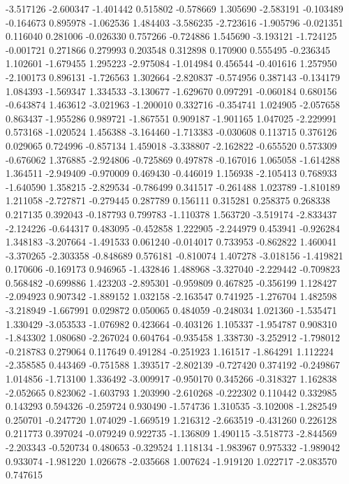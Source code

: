 -3.517126
-2.600347
-1.401442
0.515802
-0.578669
1.305690
-2.583191
-0.103489
-0.164673
0.895978
-1.062536
1.484403
-3.586235
-2.723616
-1.905796
-0.021351
0.116040
0.281006
-0.026330
0.757266
-0.724886
1.545690
-3.193121
-1.724125
-0.001721
0.271866
0.279993
0.203548
0.312898
0.170900
0.555495
-0.236345
1.102601
-1.679455
1.295223
-2.975084
-1.014984
0.456544
-0.401616
1.257950
-2.100173
0.896131
-1.726563
1.302664
-2.820837
-0.574956
0.387143
-0.134179
1.084393
-1.569347
1.334533
-3.130677
-1.629670
0.097291
-0.060184
0.680156
-0.643874
1.463612
-3.021963
-1.200010
0.332716
-0.354741
1.024905
-2.057658
0.863437
-1.955286
0.989721
-1.867551
0.909187
-1.901165
1.047025
-2.229991
0.573168
-1.020524
1.456388
-3.164460
-1.713383
-0.030608
0.113715
0.376126
0.029065
0.724996
-0.857134
1.459018
-3.338807
-2.162822
-0.655520
0.573309
-0.676062
1.376885
-2.924806
-0.725869
0.497878
-0.167016
1.065058
-1.614288
1.364511
-2.949409
-0.970009
0.469430
-0.446019
1.156938
-2.105413
0.768933
-1.640590
1.358215
-2.829534
-0.786499
0.341517
-0.261488
1.023789
-1.810189
1.211058
-2.727871
-0.279445
0.287789
0.156111
0.315281
0.258375
0.268338
0.217135
0.392043
-0.187793
0.799783
-1.110378
1.563720
-3.519174
-2.833437
-2.124226
-0.644317
0.483095
-0.452858
1.222905
-2.244979
0.453941
-0.926284
1.348183
-3.207664
-1.491533
0.061240
-0.014017
0.733953
-0.862822
1.460041
-3.370265
-2.303358
-0.848689
0.576181
-0.810074
1.407278
-3.018156
-1.419821
0.170606
-0.169173
0.946965
-1.432846
1.488968
-3.327040
-2.229442
-0.709823
0.568482
-0.699886
1.423203
-2.895301
-0.959809
0.467825
-0.356199
1.128427
-2.094923
0.907342
-1.889152
1.032158
-2.163547
0.741925
-1.276704
1.482598
-3.218949
-1.667991
0.029872
0.050065
0.484059
-0.248034
1.021360
-1.535471
1.330429
-3.053533
-1.076982
0.423664
-0.403126
1.105337
-1.954787
0.908310
-1.843302
1.080680
-2.267024
0.604764
-0.935458
1.338730
-3.252912
-1.798012
-0.218783
0.279064
0.117649
0.491284
-0.251923
1.161517
-1.864291
1.112224
-2.358585
0.443469
-0.751588
1.393517
-2.802139
-0.727420
0.374192
-0.249867
1.014856
-1.713100
1.336492
-3.009917
-0.950170
0.345266
-0.318327
1.162838
-2.052665
0.823062
-1.603793
1.203990
-2.610268
-0.222302
0.110442
0.332985
0.143293
0.594326
-0.259724
0.930490
-1.574736
1.310535
-3.102008
-1.282549
0.250701
-0.247720
1.074029
-1.669519
1.216312
-2.663519
-0.431260
0.226128
0.211773
0.397024
-0.079249
0.922735
-1.136809
1.490115
-3.518773
-2.844569
-2.203343
-0.520734
0.480653
-0.329524
1.118134
-1.983967
0.975332
-1.989042
0.933074
-1.981220
1.026678
-2.035668
1.007624
-1.919120
1.022717
-2.083570
0.747615
